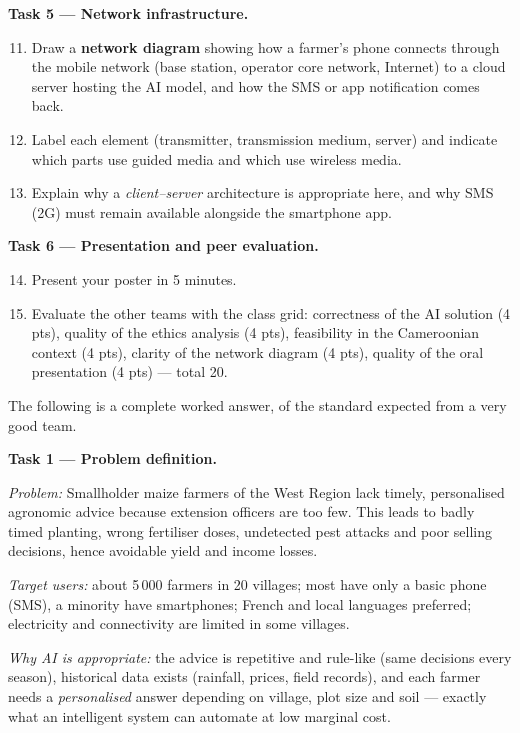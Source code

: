 \documentclass[11pt]{article}
\newcounter{popsec}
\newcounter{popsub}
\newcommand{\courssub}[1]{%
  \stepcounter{popsub}%
  \par\vspace{9pt}\noindent{\popxbold\fontsize{11.5}{13}\selectfont\color{popink}{\color{poporange}\thepopsec.\thepopsub}\hspace{6pt}#1}\par\nopagebreak\vspace{4pt}
}
\begin{document}
\textbf{Task 5 — Network infrastructure.}
\begin{enumerate}
\setcounter{enumi}{10}
\item Draw a \textbf{network diagram} showing how a farmer's phone connects through the mobile network (base station, operator core network, Internet) to a cloud server hosting the AI model, and how the SMS or app notification comes back.
\item Label each element (transmitter, transmission medium, server) and indicate which parts use guided media and which use wireless media.
\item Explain why a \emph{client–server} architecture is appropriate here, and why SMS (2G) must remain available alongside the smartphone app.
\end{enumerate}

\textbf{Task 6 — Presentation and peer evaluation.}
\begin{enumerate}
\setcounter{enumi}{13}
\item Present your poster in 5 minutes.
\item Evaluate the other teams with the class grid: correctness of the AI solution (4 pts), quality of the ethics analysis (4 pts), feasibility in the Cameroonian context (4 pts), clarity of the network diagram (4 pts), quality of the oral presentation (4 pts) — total 20.
\end{enumerate}

\courssub{Model answer}

The following is a complete worked answer, of the standard expected from a very good team.

\textbf{Task 1 — Problem definition.}

\emph{Problem:} Smallholder maize farmers of the West Region lack timely, personalised agronomic advice because extension officers are too few. This leads to badly timed planting, wrong fertiliser doses, undetected pest attacks and poor selling decisions, hence avoidable yield and income losses.

\emph{Target users:} about 5\,000 farmers in 20 villages; most have only a basic phone (SMS), a minority have smartphones; French and local languages preferred; electricity and connectivity are limited in some villages.

\emph{Why AI is appropriate:} the advice is repetitive and rule-like (same decisions every season), historical data exists (rainfall, prices, field records), and each farmer needs a \emph{personalised} answer depending on village, plot size and soil — exactly what an intelligent system can automate at low marginal cost.
\end{document}
